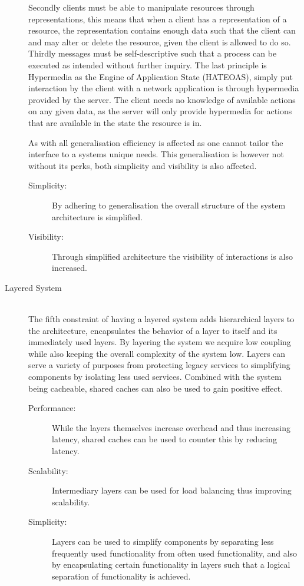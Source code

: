 \begin{description}
    Secondly clients must be able to manipulate resources through representations, this means that when a client has a representation of a resource, the representation contains enough data such that the client can and may alter or delete the resource, given the client is allowed to do so.
    Thirdly messages must be self-descriptive such that a process can be executed as intended without further inquiry.
    The last principle is Hypermedia as the Engine of Application State (HATEOAS), simply put interaction by the client with a network application is through hypermedia provided by the server.
    The client needs no knowledge of available actions on any given data, as the server will only provide hypermedia for actions that are available in the state the resource is in.

    As with all generalisation efficiency is affected as one cannot tailor the interface to a systems unique needs.
    This generalisation is however not without its perks, both simplicity and visibility is also affected.
    \begin{description}
        \item[Simplicity:] By adhering to generalisation the overall structure of the system architecture is simplified.
        \item[Visibility:] Through simplified architecture the visibility of interactions is also increased.
    \end{description}
    \item [Layered System\label{layeredsystem}] \hfill \\
    The fifth constraint of having a layered system adds hierarchical layers to the architecture, encapsulates the behavior of a layer to itself and its immediately used layers.
    By layering the system we acquire low coupling while also keeping the overall complexity of the system low.
    Layers can serve a variety of purposes from protecting legacy services to simplifying components by isolating less used services.
    Combined with the system being cacheable, shared caches can also be used to gain positive effect.
    \begin{description}
        \item[Performance:] While the layers themselves increase overhead and thus increasing latency, shared caches can be used to counter this by reducing latency.
        \item[Scalability:] Intermediary layers can be used for load balancing thus improving scalability.
        \item[Simplicity:] Layers can be used to simplify components by separating less frequently used functionality from often used functionality, and also by encapsulating certain functionality in layers such that a logical separation of functionality is achieved.

\end{description}
\end{description}
